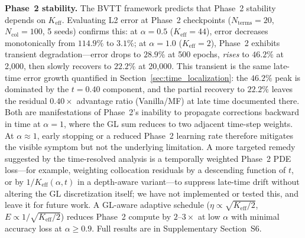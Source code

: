 \documentclass[11pt]{article}
\newcommand{\Ncol}{N_{\mathrm{col}}}
\begin{document}
\textbf{Phase~2 stability.} The BVTT framework predicts that Phase~2 stability depends on $K_{\mathrm{eff}}$. Evaluating L2 error at Phase~2 checkpoints ($N_{\mathrm{terms}} = 20$, $\Ncol = 100$, 5 seeds) confirms this: at $\alpha = 0.5$ ($K_{\mathrm{eff}} = 44$), error decreases monotonically from $114.9\%$ to $3.1\%$; at $\alpha = 1.0$ ($K_{\mathrm{eff}} = 2$), Phase~2 exhibits transient degradation---error drops to $28.9\%$ at 500 epochs, \emph{rises} to $46.2\%$ at 2{,}000, then slowly recovers to $22.2\%$ at 20{,}000. This transient is the same late-time error growth quantified in Section~\ref{sec:time_localization}: the $46.2\%$ peak is dominated by the $t = 0.40$ component, and the partial recovery to $22.2\%$ leaves the residual $0.40\times$ advantage ratio (Vanilla/MF) at late time documented there. Both are manifestations of Phase~2's inability to propagate corrections backward in time at $\alpha = 1$, where the GL sum reduces to two adjacent time-step weights. At $\alpha \approx 1$, early stopping or a reduced Phase~2 learning rate therefore mitigates the visible symptom but not the underlying limitation. A more targeted remedy suggested by the time-resolved analysis is a temporally weighted Phase~2 PDE loss---for example, weighting collocation residuals by a descending function of $t$, or by $1/K_{\mathrm{eff}}(\alpha, t)$ in a depth-aware variant---to suppress late-time drift without altering the GL discretization itself; we have not implemented or tested this, and leave it for future work. A GL-aware adaptive schedule ($\eta \propto \sqrt{K_{\mathrm{eff}}/2}$, $E \propto 1/\sqrt{K_{\mathrm{eff}}/2}$) reduces Phase~2 compute by $2$--$3\times$ at low $\alpha$ with minimal accuracy loss at $\alpha \geq 0.9$. Full results are in Supplementary Section~S6.
\end{document}
